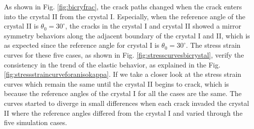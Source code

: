 \documentclass[3p,10pt,sort&compress]{elsarticle}
\begin{document}
As shown in Fig. \ref{fig:bicryfrac}, the crack paths changed when the crack enters into the crystal II from the crystal I. Especially, when the reference angle of the crystal II is $\theta_0 = 30^{\circ}$, the cracks in the crystal I and crystal II showed a mirror symmetry behaviors along the adjacent boundary of the crystal I and II, which is as expected since the reference angle for crystal I is $\theta_0 = 30^{\circ}$. The stress strain curves for these five cases, as shown in Fig. \ref{fig:stresscurvesbicrystal}, verify the consistency in the trend of the elastic behavior, as explained in the Fig. \ref{fig:stressstraincurveforanisokappa}. If we take a closer look at the stress strain curves which remain the same until the crystal II begins to crack, which is because the reference angles of the crystal I for all the cases are the same. The curves started to diverge in small differences when each crack invaded the crystal II where the reference angles differed from the crystal I and varied through the five simulation cases.
\end{document}
